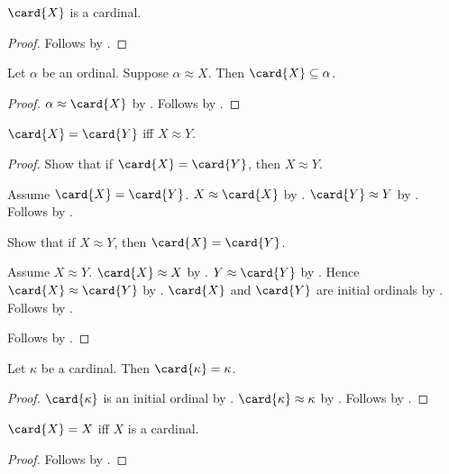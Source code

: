 \begin{theorem}\label{card_is_cardinal}
    $\card{X}$ is a cardinal.
\end{theorem}
\begin{proof}
    Follows by .
\end{proof}

\begin{theorem}\label{card_least_equinumerous_ordinal}
    Let $\alpha$ be an ordinal.
    Suppose $\alpha\approx X$.
    Then $\card{X}\subseteq\alpha$.
\end{theorem}
\begin{proof}
    $\alpha\approx\card{X}$
        by .
    Follows by
        .
\end{proof}

\begin{theorem}\label{card_eq_iff_equinumerous}
    $\card{X}=\card{Y}$ iff $X\approx Y$.
\end{theorem}
\begin{proof}
    Show that if $\card{X}=\card{Y}$, then $X\approx Y$.
    \begin{subproof}
        Assume $\card{X}=\card{Y}$.
        $X\approx\card{X}$ by .
        $\card{Y}\approx Y$ by .
        Follows by .
    \end{subproof}
    Show that if $X\approx Y$, then $\card{X}=\card{Y}$.
    \begin{subproof}
        Assume $X\approx Y$.
        $\card{X}\approx X$ by .
        $Y\approx\card{Y}$ by .
        Hence $\card{X}\approx\card{Y}$ by .
        $\card{X}$ and $\card{Y}$ are initial ordinals
            by .
        Follows by .
    \end{subproof}
    Follows by \auto.
\end{proof}

\begin{proposition}\label{card_of_cardinal}
    Let $\kappa$ be a cardinal.
    Then $\card{\kappa}=\kappa$.
\end{proposition}
\begin{proof}
    $\card{\kappa}$ is an initial ordinal
        by .
    $\card{\kappa}\approx\kappa$ by .
    Follows by .
\end{proof}

\begin{proposition}\label{card_fixed_iff_cardinal}
    $\card{X}=X$ iff $X$ is a cardinal.
\end{proposition}
\begin{proof}
    Follows by .
\end{proof}
